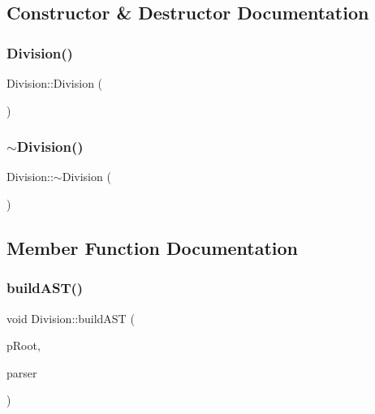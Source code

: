 \subsection{Constructor \& Destructor Documentation}
\mbox{\label{class_division_a1cae0ab3b18df50d9986d2b879b7f464}} 
\subsubsection{\texorpdfstring{Division()}{Division()}}
{\footnotesize\ttfamily Division\+::\+Division (\begin{DoxyParamCaption}{ }\end{DoxyParamCaption})}

\mbox{\label{class_division_a7f08073a7e2e201182af12610cd5e3eb}} 
\subsubsection{\texorpdfstring{$\sim$Division()}{~Division()}}
{\footnotesize\ttfamily Division\+::$\sim$\+Division (\begin{DoxyParamCaption}{ }\end{DoxyParamCaption})}



\subsection{Member Function Documentation}
\mbox{\label{class_division_a217df7aed2f8edd71bce9a196243fc81}} 
\subsubsection{\texorpdfstring{buildAST()}{buildAST()}}
{\footnotesize\ttfamily void Division\+::build\+A\+ST (\begin{DoxyParamCaption}\item[{std\+::unique\+\_\+ptr$<$ \mbox{\hyperlink{class_abstract_expression}{Abstract\+Expression}} $>$ \&}]{p\+Root,  }\item[{\mbox{\hyperlink{class_parser}{Parser}} \&}]{parser }\end{DoxyParamCaption})\hspace{0.3cm}{\ttfamily [virtual]}}



